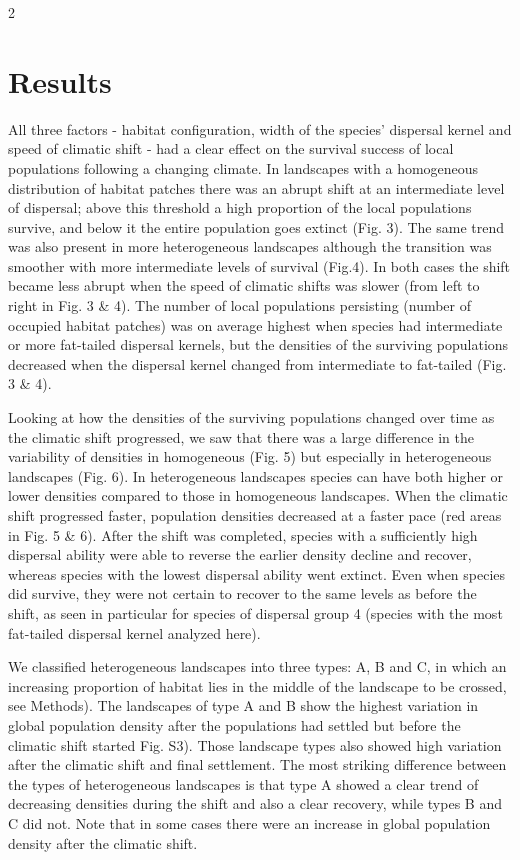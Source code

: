\documentclass[12pt,pdftex]{article}
\begin{document}
\begin{spacing}{2}
\section*{Results}
All three factors - habitat configuration, width of the species’ dispersal kernel and speed of climatic shift - had a clear effect on the survival success of local populations following a changing climate. In landscapes with a homogeneous distribution of habitat patches there was an abrupt shift at an intermediate level of dispersal; above this threshold a high proportion of the local populations survive, and below it the entire population goes extinct (Fig. 3). The same trend was also present in more heterogeneous landscapes although the transition was smoother with more intermediate levels of survival (Fig.4). In both cases the shift became less abrupt when the speed of climatic shifts was slower (from left to right in Fig. 3 \& 4). The number of local populations persisting (number of occupied habitat patches) was on average highest when species had intermediate or more fat-tailed dispersal kernels, but the densities of the surviving populations decreased when the dispersal kernel changed from intermediate to fat-tailed (Fig. 3 \& 4). 


Looking at how the densities of the surviving populations changed over time as the climatic shift progressed, we saw that there was a large difference in the variability of densities in homogeneous (Fig. 5) but especially in heterogeneous landscapes (Fig. 6). In heterogeneous landscapes species can have both higher or lower densities compared to those in homogeneous landscapes. When the climatic shift progressed faster, population densities decreased at a faster pace (red areas in Fig. 5 \& 6). After the shift was completed, species with a sufficiently high dispersal ability were able to reverse the earlier density decline and recover, whereas species with the lowest dispersal ability went extinct. Even when species did survive, they were not certain to recover to the same levels as before the shift, as seen in particular for species of dispersal group 4 (species with the most fat-tailed dispersal kernel analyzed here).


We classified heterogeneous landscapes into three types: A, B and C, in which an increasing proportion of habitat lies in the middle of the landscape to be crossed, see Methods). The landscapes of type A and B show the highest variation in global population density after the populations had settled but before the climatic shift started Fig. S3). Those landscape types also showed high variation after the climatic shift and final settlement. The most striking difference between the types of heterogeneous landscapes is that type A showed a clear trend of decreasing densities during the shift and also a clear recovery, while types B and C did not. Note that in some cases there were an increase in global population density after the climatic shift.     


\end{spacing}
\end{document}
